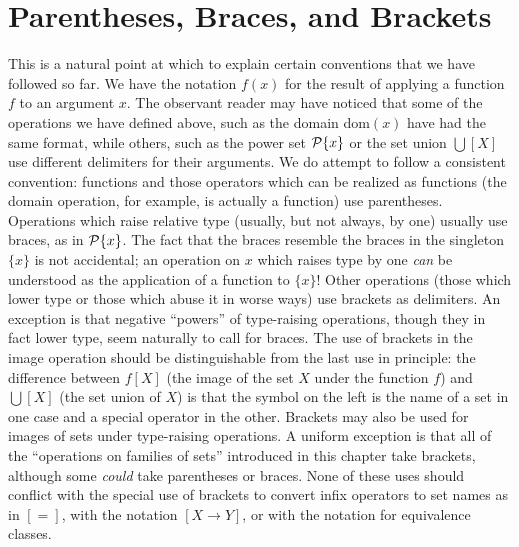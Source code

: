 \section{Parentheses, Braces, and Brackets}\label{sec-par}

This is a natural point at which to explain certain conventions that
we have followed so far.  We have the notation $f(x)$ for the result
of applying a function $f$ to an argument $x$.  The
observant reader may have noticed that some of the operations we have
defined above, such as the domain dom$(x)$ have had the
same format, while others, such as the power set
${\cal P}\{x\}$ or the set union $\bigcup[X]$ use
different delimiters for their arguments.  We do attempt to follow a
consistent convention: functions and those operators which can be
realized as functions (the domain operation, for
example, is actually a function) use parentheses.  Operations which
raise relative type (usually, but not always,
by one) usually use braces, as in ${\cal P}\{x\}$.  The fact that the
braces resemble the braces in the singleton $\{x\}$
is not accidental; an operation on $x$ which raises type by one {\itshape
can\/} be understood as the application of a function to $\{x\}$!
Other operations (those which lower type or those which abuse it in
worse ways) use brackets as delimiters. An exception is that negative
``powers'' of type-raising operations,
though they in fact lower type, seem naturally to call for braces.
The use of brackets in the image operation should be distinguishable
from the last use in principle: the difference between $f[X]$ (the
image of the set $X$ under the function $f$) and
$\bigcup[X]$ (the set union of $X$) is that the symbol on the left is
the name of a set in one case and a special operator in the other.
Brackets may also be used for images of sets under
type-raising operations.  A uniform
exception is that all of the ``operations on families of sets''
introduced in this chapter take brackets, although some {\itshape could\/}
take parentheses or braces.  None of these uses should conflict with
the special use of brackets to convert infix operators to set names as
in $[=]$, with the notation $[X \rightarrow Y]$, or with the notation
for equivalence classes.






